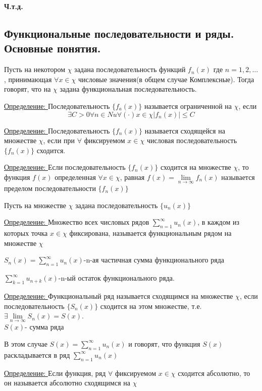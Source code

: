 \documentclass[12pt]{article}
\let\oldsum\sum
\let\oldlim\lim
\renewcommand{\sum}{\oldsum\limits}
\renewcommand{\lim}{\oldlim\limits}
\begin{document}
  \begin{center}
    \textbf{Ч.т.д.}
  \end{center}

  \subsection{Функциональные последовательности и ряды. Основные понятия.}

  Пусть на некотором $\chi$ задана последовательность функций $f_n(x)$ где $n=1,2,\dots$, принимающая
  $\forall x \in \chi$ числовые значения(в общем случае Комплексные). Тогда говорят, что на $\chi$ задана 
  функциональная последовательность.
  
  \underline{Определение: } Последовательность $\{f_a(x)\}$ называется ограниченной на $\chi$, если 
  \[\exists C>0 \forall n \in N u \forall (\cdot) x \in \chi |f_n(x)| \leq C\]

  \underline{Определение: } Последовательность $\{f_n(x)\}$ называется сходящейся на множестве $\chi$, если
  при $\forall$ фиксируемом $x \in \chi$ числовая последовательность $\{f_n(x)\}$ сходится.

  \underline{Определение: }Если последовательность $\{f_n(x)\}$ сходится на множестве $\chi$, то функция $f(x)$
  определенная $\forall x \in \chi$, равная $f(x)=\lim_{n \to \infty} f_n(x)$ называется пределом последовательности
  $\{f_n(x)\}$

  Пусть на множестве $\chi$ задана последовательность $\{u_n(x)\}$

  \underline{Определение: } Множество всех числовых рядов $\sum_{n=1}^{\infty} u_n(x)$, в каждом из которых
  точка $x \in \chi$ фиксирована, называется функциональным рядом на множестве $\chi$

  $S_n(x)=\sum_{n=1}^{\infty}u_n(x)$-n-ая частичная сумма функционального ряда

  $\sum_{k=1}^{\infty} u_{n+k}(x)$-n-ый остаток функционального ряда.

  \underline{Определение: } Функциональный ряд называется сходящимся на множестве $\chi$, если
  последовательность $\{S_n(x)\}$ сходится на этом множестве, т.е. $\exists \lim_{n \to \infty} S_n(x)=S(x)$.\\
  $S(x)$- сумма ряда

  В этом случае $S(x) = \sum_{n=1}^{\infty}u_n(x)$ и говорят, что функция $S(x)$ раскладывается в ряд $\sum_{n=1}^{\infty} u_n(x)$

  \underline{Определение: } Если функция, ряд $\forall$ фиксируемом $x \in \chi$ сходится абсолютно, то он называется
  абсолютно сходящимся на $\chi$
\end{document}
